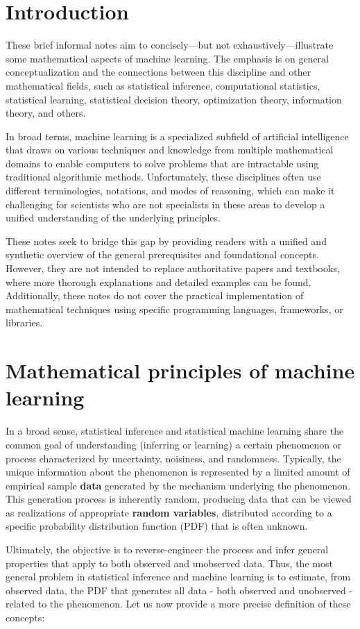 \documentclass{report}
\begin{document}
\chapter*{Introduction}
These brief informal notes aim to concisely—but not exhaustively—illustrate some mathematical aspects of machine learning. The emphasis is on general conceptualization and the connections between this discipline and other mathematical fields, such as statistical inference, computational statistics, statistical learning, statistical decision theory, optimization theory, information theory, and others.

In broad terms, machine learning is a specialized subfield of artificial intelligence that draws on various techniques and knowledge from multiple mathematical domains to enable computers to solve problems that are intractable using traditional algorithmic methods. Unfortunately, these disciplines often use different terminologies, notations, and modes of reasoning, which can make it challenging for scientists who are not specialists in these areas to develop a unified understanding of the underlying principles.

These notes seek to bridge this gap by providing readers with a unified and synthetic overview of the general prerequisites and foundational concepts. However, they are not intended to replace authoritative papers and textbooks, where more thorough explanations and detailed examples can be found. Additionally, these notes do not cover the practical implementation of mathematical techniques using specific programming languages, frameworks, or libraries.

\chapter{Mathematical principles of machine learning}
In a broad sense, statistical inference and statistical machine learning share the common goal of understanding (inferring or learning) a certain phenomenon or process characterized by uncertainty, noisiness, and randomness. Typically, the unique information about the phenomenon is represented by a limited amount of empirical sample \textbf{data} generated by the mechanism underlying the phenomenon. This generation process is inherently random, producing data that can be viewed as realizations of appropriate \textbf{random variables}, distributed according to a specific probability distribution function (PDF) that is often unknown.

Ultimately, the objective is to reverse-engineer the process and infer general properties that apply to both observed and unobserved data. Thus, the most general problem in statistical inference and machine learning is to estimate, from observed data, the PDF that generates all data - both observed and unobserved - related to the phenomenon. Let us now provide a more precise definition of these concepts:
\end{document}
